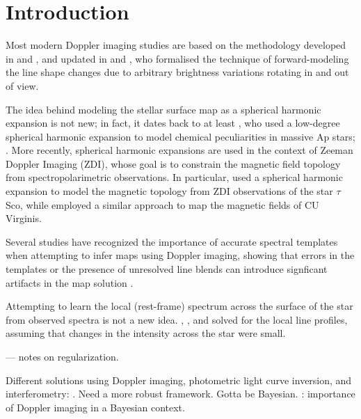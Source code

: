 \documentclass[modern]{aastex631}
\begin{document}
\section{Introduction}

Most modern Doppler imaging studies are based on the methodology developed in \citet{Goncharskii1977} and \citet{Goncharskii1982}, and updated in \citet{Vogt1983} and \citet{Vogt1987}, who formalised the technique of forward-modeling the line shape changes due to arbitrary brightness variations rotating in and out of view.


The idea behind modeling the stellar surface map as a spherical harmonic expansion is not new; in fact, it dates back to at least \citet{Deutsch1958}, who used a low-degree spherical harmonic expansion to model chemical peculiarities in massive Ap stars; \citep[see also][]{Deutsch1970,Falk1974}.
More recently, spherical harmonic expansions are used in the context of Zeeman Doppler Imaging (ZDI), whose goal is to constrain the magnetic field topology from spectropolarimetric observations.
In particular, \citet{Donati2006} used a spherical harmonic expansion to model the magnetic topology from ZDI observations of the star $\tau$ Sco, while \citet{Kochukhov2014} employed a similar approach to map the magnetic fields of CU Virginis.


Several studies have recognized the importance of accurate spectral templates when attempting to infer maps using Doppler imaging, showing that errors in the templates or the presence of unresolved line blends can introduce signficant artifacts in the map solution \citep[e.g.,][]{Rice1989,Unruh1995}.


Attempting to learn the local (rest-frame) spectrum across the surface of the star from observed spectra is not a new idea.
\citet{Khokhlova1976}, \citet{Goncharskii1977}, and \citet{Goncharskii1982} solved for the local line profiles, assuming that changes in the intensity across the star were small.



\citet{Piskunov1990} --- notes on regularization.



Different solutions using Doppler imaging, photometric light curve inversion, and interferometry: \citep{Roettenbacher2017}. Need a more robust framework. Gotta be Bayesian.
\citet{AsensioRamos2021}: importance of Doppler imaging in a Bayesian context.
\end{document}
